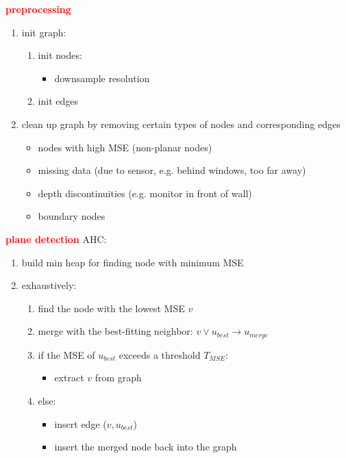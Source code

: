 \documentclass[main.tex]{subfiles}
\begin{document}
\textbf{\textcolor{red}{preprocessing}}
\begin{enumerate}
    \item init graph:
    \begin{enumerate}
        \item init nodes:
        \begin{itemize}
            \item downsample resolution
        \end{itemize}
        \item init edges
    \end{enumerate} 
    \item clean up graph by removing certain types of nodes and corresponding edges
    \begin{itemize}
        \item nodes with high MSE (non-planar nodes)
        \item missing data (due to sensor, e.g. behind windows, too far away)
        \item depth discontinuities (e.g. monitor in front of wall)
        \item boundary nodes
    \end{itemize}
\end{enumerate}
\textbf{\textcolor{red}{plane detection}}
AHC:
\begin{enumerate}
    \item build min heap for finding node with minimum MSE
    \item exhaustively:
    \begin{enumerate}
        \item find the node with the lowest MSE $v$
        \item merge with the best-fitting neighbor: $v \lor u_{best} \rightarrow u_{merge}$ 
        \item if the MSE of $u_{best}$ exceeds a threshold $T_{MSE}$:
        \begin{itemize}
            \item extract $v$ from graph
        \end{itemize}
        \item else:
        \begin{itemize}
            \item insert edge ($v,u_{best}$) 
            \item insert the merged node back into the graph
        \end{itemize}
    \end{enumerate}
\end{enumerate}
\end{document}
